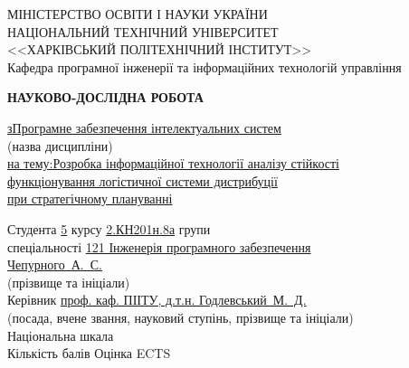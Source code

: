 {
\newcommand{\fillemptyline}{\uline{\hspace*{\fill}}}
\newcommand{\fillline}[2][]{\uline{#1\hspace*{\fill}#2\hspace*{\fill}\hphantom{#1}}}

\newcommand{\suline}[1]{\uline{\hspace{12pt}#1\hspace{12pt}}}
\newcommand{\undercaption}[1]{{\centering\footnotesize#1\\\noindent}}

\begin{titlepage}
	\begin{center}
		МІНІСТЕРСТВО ОСВІТИ І НАУКИ УКРАЇНИ \\
		НАЦІОНАЛЬНИЙ ТЕХНІЧНИЙ УНІВЕРСИТЕТ \\
		<<ХАРКІВСЬКИЙ ПОЛІТЕХНІЧНИЙ ІНСТИТУТ>> \\
		Кафедра програмної інженерії та інформаційних технологій управління
	\end{center}
	\vspace*{\fill}
	\begin{center}
		\MakeUppercase{\large\bfseries Науково-дослідна робота}
	\end{center}
	\noindent
	\fillline[з]{Програмне забезпечення інтелектуальних систем} \\
	\undercaption{(назва дисципліни)}
	\fillline[на тему:]{Розробка інформаційної технології аналізу стійкості} \\
	\fillline{функціонування логістичної системи дистрибуції} \\
	\fillline{при стратегічному плануванні}
	
	\vspace*{\fill}

	\begin{addmargin}[7cm]{0cm}
		\small
		Студента \suline{5} курсу \suline{2.КН201н.8а} групи \hspace*{\fill} \\
		спеціальності \fillline{121 Інженерія програмного забезпечення} \\ 
		\fillline{Чепурного~А.~С.} \\
		\undercaption{(прізвище та ініціали)}
		Керівник \fillline{проф. каф. ПІІТУ, д.т.н. Годлевський~М.~Д.} \\
		\undercaption{(посада, вчене звання, науковий ступінь, прізвище та ініціали)}
		Національна шкала \fillemptyline \\
		Кількість балів	\fillemptyline Оцінка ECTS \fillemptyline	
	\end{addmargin}


\end{titlepage}}
